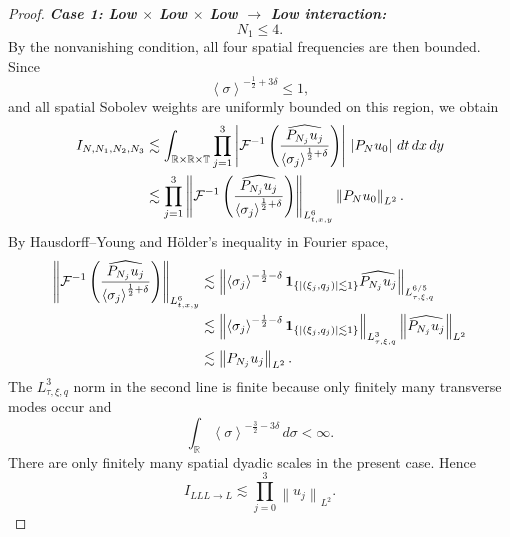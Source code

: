 \documentclass[12pt,oneside,reqno]{amsart}
\numberwithin{equation}{section}
\theoremstyle{plain}
\def\R{{\mathbb R}}
\def\T{{\mathbb T}}
\newcommand{\abs}[1]{%
    \left|#1\right|%
}
\newcommand{\inp}[1]{%
    \left\langle #1\right\rangle
}
\newcommand{\Lpn}[2]{%
    \left\lVert #1\right\rVert_{L^{#2}}%
}
\newcommand{\Fh}[1]{\widehat{#1}}
\newcommand{\Ifr}[4]{%
    I_{{#1}{#2}{#3}\to{#4}}%
}
\newcommand{\Ns}{{N,N_1,N_2,N_3}}
\begin{document}
\begin{proof}
\noindent
\textbf{\emph{Case 1: Low $\times$ Low $\times$ Low $\to$ Low interaction:}}
\begin{equation}
    N_1\leq4.
\end{equation}
By the nonvanishing condition, all four spatial frequencies are then bounded. Since
\begin{equation}
    \inp{\sigma}^{-\frac12+3\delta}
    \leq1,
\end{equation}
and all spatial Sobolev weights are uniformly bounded on this region,
we obtain
\begin{align}
I_{\Ns}
&\lesssim
\int_{\R\times\R\times\T}
\prod_{j=1}^3
\abs{
\mathcal F^{-1}
\left(
    \frac{
        \Fh{P_{N_j}u_j}
    }{
        \inp{\sigma_j}^{\frac12+\delta}
    }
\right)
}
\,
\abs{P_Nu_0}
\,dt\,dx\,dy
\nonumber\\
&\lesssim
\prod_{j=1}^3
\left\|
\mathcal F^{-1}
\left(
    \frac{
        \Fh{P_{N_j}u_j}
    }{
        \inp{\sigma_j}^{\frac12+\delta}
    }
\right)
\right\|_{L^6_{t,x,y}}
\Lpn{P_Nu_0}{2}.
\label{eq:case1-holder}
\end{align}
By Hausdorff--Young and H\"older's inequality in Fourier space,
\begin{align}
\left\|
\mathcal F^{-1}
\left(
    \frac{
        \Fh{P_{N_j}u_j}
    }{
        \inp{\sigma_j}^{\frac12+\delta}
    }
\right)
\right\|_{L^6_{t,x,y}}
\nonumber
&
\lesssim
\left\|
    \inp{\sigma_j}^{-\frac12-\delta}
    \mathbf 1_{\{\abs{(\xi_j,q_j)}\lesssim1\}}
    \Fh{P_{N_j}u_j}
\right\|_{L^{6/5}_{\tau,\xi,q}}
\nonumber\\
&
\lesssim
\left\|
    \inp{\sigma_j}^{-\frac12-\delta}
    \mathbf 1_{\{\abs{(\xi_j,q_j)}\lesssim1\}}
\right\|_{L^3_{\tau,\xi,q}}
\Lpn{\Fh{P_{N_j}u_j}}{2}
\nonumber\\
&
\lesssim
\Lpn{P_{N_j}u_j}{2}.
\label{eq:case1-L6}
\end{align}
The $L^3_{\tau,\xi,q}$ norm in the second line is finite because only finitely
many transverse modes occur and
\begin{equation}
    \int_{\R}
    \inp{\sigma}^{-\frac32-3\delta}
    \,d\sigma
    <\infty.
\end{equation}
There are only finitely many spatial dyadic scales in the present case. Hence
\begin{equation}
\label{eq:case1-final}
    \Ifr{L}{L}{L}{L}
    \lesssim
    \prod_{j=0}^3
    \Lpn{u_j}{2}.
\end{equation}


\end{proof}
\end{document}
